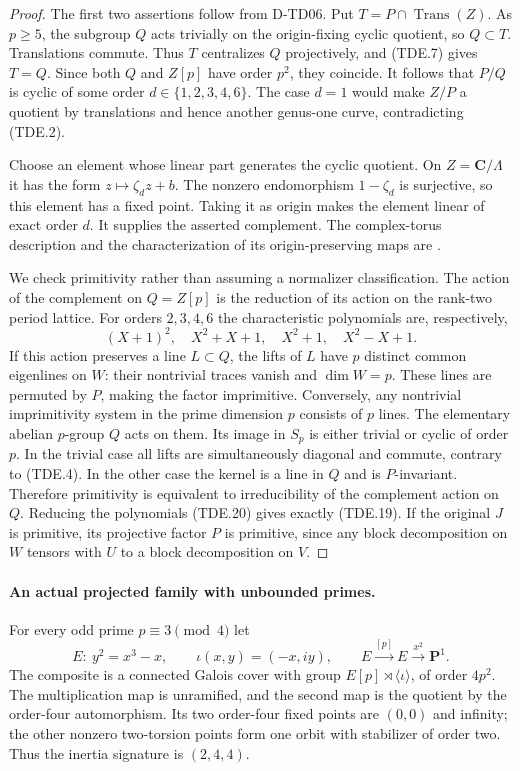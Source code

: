 \begin{proof}
The first two assertions follow from D-TD06.  Put
$T=P\cap\operatorname{Trans}(Z)$.  As $p\ge5$, the subgroup
$Q$ acts trivially on the origin-fixing cyclic quotient, so
$Q\subset T$.  Translations commute.  Thus $T$ centralizes $Q$
projectively, and (TDE.7) gives $T=Q$.  Since both $Q$ and $Z[p]$
have order $p^2$, they coincide.  It follows that $P/Q$ is cyclic
of some order $d\in\{1,2,3,4,6\}$.  The case $d=1$ would make
$Z/P$ a quotient by translations and hence another genus-one curve,
contradicting (TDE.2).

Choose an element whose linear part generates the cyclic quotient.
On $Z=\mathbf C/\Lambda$ it has the form $z\mapsto\zeta_d z+b$.
The nonzero endomorphism $1-\zeta_d$ is surjective, so this element
has a fixed point.  Taking it as origin makes the element linear
of exact order $d$.  It supplies the asserted complement.  The
complex-torus description and the characterization of its
origin-preserving maps are
\cite[ChapterIII, Proposition3.3, p.~94, and Theorem3.10, p.~96]{TD:MilneEC2021}.

We check primitivity rather than assuming a normalizer classification.
The action of the complement on $Q=Z[p]$ is the reduction of its
action on the rank-two period lattice.  For orders $2,3,4,6$ the
characteristic polynomials are, respectively,
\[
             (X+1)^2,\quad X^2+X+1,\quad X^2+1,\quad X^2-X+1.
             \tag{TDE.20}
\]
If this action preserves a line $L\subset Q$, the lifts of $L$
have $p$ distinct common eigenlines on $W$: their nontrivial traces
vanish and $\dim W=p$.  These lines are permuted by $P$, making
the factor imprimitive.  Conversely, any nontrivial imprimitivity
system in the prime dimension $p$ consists of $p$ lines.  The
elementary abelian $p$-group $Q$ acts on them.  Its image in $S_p$
is either trivial or cyclic of order $p$.  In the trivial case
all lifts are simultaneously diagonal and commute, contrary to
(TDE.4).  In the other case the kernel is a line in $Q$ and is
$P$-invariant.  Therefore primitivity is equivalent to irreducibility
of the complement action on $Q$.  Reducing the polynomials (TDE.20)
gives exactly (TDE.19).  If the original $J$ is primitive, its
projective factor $P$ is primitive, since any block decomposition
on $W$ tensors with $U$ to a block decomposition on $V$.
\end{proof}

\paragraph{An actual projected family with unbounded primes.}
For every odd prime $p\equiv3\pmod4$ let
\[
       E:\ y^2=x^3-x,\qquad \iota(x,y)=(-x,iy),\qquad
       E\xrightarrow{[p]}E\xrightarrow{x^2}\mathbf P^1.
       \tag{TDE.21}
\]
The composite is a connected Galois cover with group
$E[p]\rtimes\langle\iota\rangle$, of order $4p^2$.
The multiplication map is unramified, and the second map is the
quotient by the order-four automorphism.  Its two order-four fixed
points are $(0,0)$ and infinity; the other nonzero two-torsion
points form one orbit with stabilizer of order two.  Thus the
inertia signature is $(2,4,4)$.

